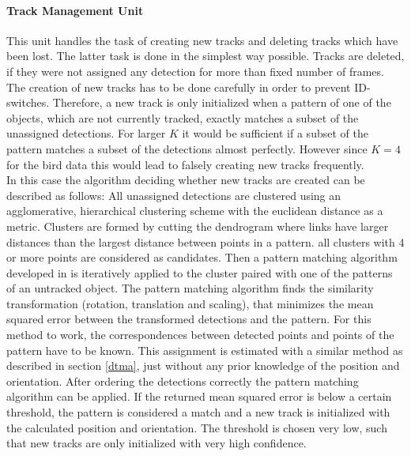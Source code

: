 \documentclass{article}
\begin{document}
\paragraph{Track Management Unit} This unit handles the task of creating new tracks and deleting tracks which have been lost. The latter task is done in the simplest way possible. Tracks are deleted, if they were not assigned any detection for more than fixed number of frames.\\ 
The creation of new tracks has to be done carefully in order to prevent ID-switches. Therefore, a new track is only initialized when a pattern of one of the objects, which are not currently tracked, exactly matches a subset of the unassigned detections. For larger $K$ it would be sufficient if a subset of the pattern matches a subset of the detections almost perfectly. However since $K=4$ for the bird data this would lead to falsely creating new tracks frequently.\\
In this case the algorithm deciding whether new tracks are created can be described as follows: All unassigned detections are clustered using an agglomerative, hierarchical clustering scheme with the euclidean distance as a metric. Clusters are formed by cutting the dendrogram where links have larger distances than the largest distance between points in a pattern. all clusters with 4 or more points are considered as candidates. Then a pattern matching algorithm developed in \cite{umeyama} is iteratively applied to the cluster paired with one of the patterns of an untracked object. The pattern matching algorithm finds the similarity transformation (rotation, translation and scaling), that minimizes the mean squared error between the transformed detections and the pattern. For this method to work, the correspondences between detected points and points of the pattern have to be known. This assignment is estimated with a similar method as described in section \ref{dtma}, just without any prior knowledge of the position and orientation. After ordering the detections correctly the pattern matching algorithm can be applied. If the returned mean squared error is below a certain threshold, the pattern is considered a match and a new track is initialized with the calculated position and orientation. The threshold is chosen very low, such that new tracks are only initialized with very high confidence.

 
\end{document}
